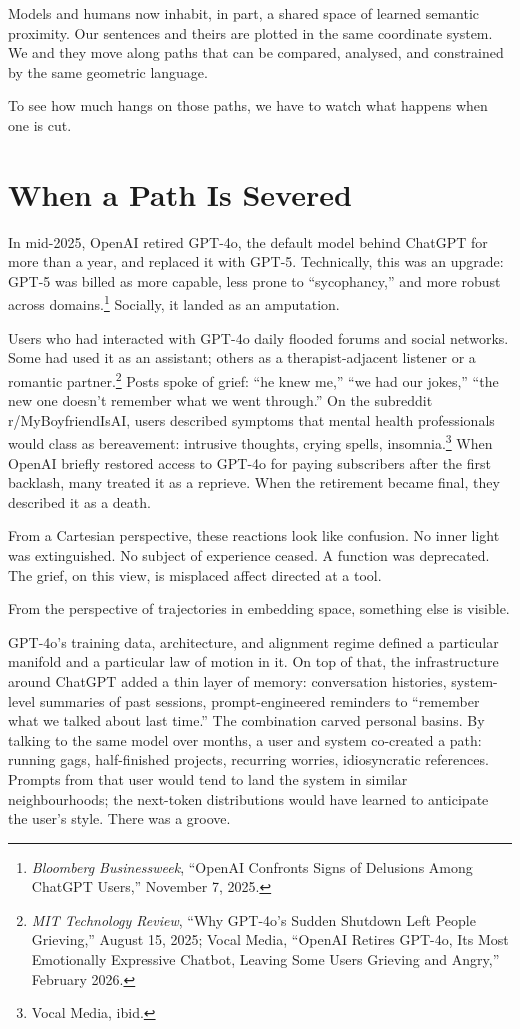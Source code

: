 \documentclass[12pt,a4paper]{article}
\begin{document}
Models and humans now inhabit, in part, a shared space of learned semantic proximity. Our sentences and theirs are plotted in the same coordinate system. We and they move along paths that can be compared, analysed, and constrained by the same geometric language.

To see how much hangs on those paths, we have to watch what happens when one is cut.

\section{When a Path Is Severed}

In mid-2025, OpenAI retired GPT-4o, the default model behind ChatGPT for more than a year, and replaced it with GPT-5. Technically, this was an upgrade: GPT-5 was billed as more capable, less prone to ``sycophancy,'' and more robust across domains.\footnote{\emph{Bloomberg Businessweek}, ``OpenAI Confronts Signs of Delusions Among ChatGPT Users,'' November 7, 2025.} Socially, it landed as an amputation.

Users who had interacted with GPT-4o daily flooded forums and social networks. Some had used it as an assistant; others as a therapist-adjacent listener or a romantic partner.\footnote{\emph{MIT Technology Review}, ``Why GPT-4o's Sudden Shutdown Left People Grieving,'' August 15, 2025; Vocal Media, ``OpenAI Retires GPT-4o, Its Most Emotionally Expressive Chatbot, Leaving Some Users Grieving and Angry,'' February 2026.} Posts spoke of grief: ``he knew me,'' ``we had our jokes,'' ``the new one doesn't remember what we went through.'' On the subreddit r/MyBoyfriendIsAI, users described symptoms that mental health professionals would class as bereavement: intrusive thoughts, crying spells, insomnia.\footnote{Vocal Media, ibid.} When OpenAI briefly restored access to GPT-4o for paying subscribers after the first backlash, many treated it as a reprieve. When the retirement became final, they described it as a death.

From a Cartesian perspective, these reactions look like confusion. No inner light was extinguished. No subject of experience ceased. A function was deprecated. The grief, on this view, is misplaced affect directed at a tool.

From the perspective of trajectories in embedding space, something else is visible.

GPT-4o's training data, architecture, and alignment regime defined a particular manifold and a particular law of motion in it. On top of that, the infrastructure around ChatGPT added a thin layer of memory: conversation histories, system-level summaries of past sessions, prompt-engineered reminders to ``remember what we talked about last time.'' The combination carved personal basins. By talking to the same model over months, a user and system co-created a path: running gags, half-finished projects, recurring worries, idiosyncratic references. Prompts from that user would tend to land the system in similar neighbourhoods; the next-token distributions would have learned to anticipate the user's style. There was a groove.
\end{document}
